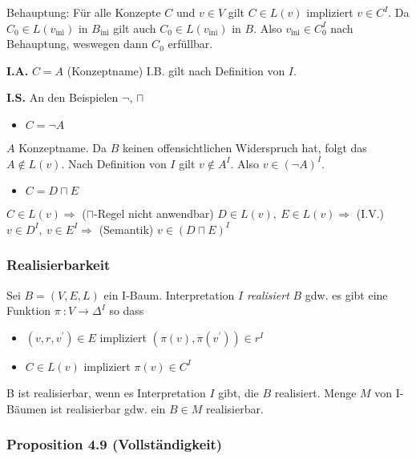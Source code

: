 Behauptung: Für alle Konzepte $C$ und $v \in V$ gilt
$C \in L\left( v \right)$ impliziert $v \in C^{I}$. Da
$C_{0} \in L\left( v_{\text{ini}} \right)$ in $B_{\text{ini}}$ gilt
auch $C_{0} \in L\left( v_{\text{ini}} \right)$ in $B$. Also
$v_{\text{ini}} \in C_{0}^{I}$ nach Behauptung, weswegen dann
$C_{0}$ erfüllbar.

\textbf{I.A.} $C = A$ (Konzeptname) I.B. gilt nach Definition von
$I$.

\textbf{I.S.} An den Beispielen $\neg$, $\sqcap$

\begin{itemize}
\item
  $C = \neg A$
\end{itemize}

$A$ Konzeptname. Da $B$ keinen offensichtlichen Widerspruch hat,
folgt das $A \notin L(v)$. Nach Definition von $I$ gilt
$v \notin A^{I}$. Also $v \in \left( \neg A \right)^{I}$.

\begin{itemize}
\item
  $C = D \sqcap E$
\end{itemize}

$C \in L\left( v \right) \Rightarrow$ ($\sqcap$-Regel nicht
anwendbar)
$D \in L\left( v \right),\ E \in L\left( v \right) \Rightarrow$ (I.V.)
$v \in D^{I},\ v \in E^{I} \Rightarrow$ (Semantik)
$v \in \left( D \sqcap E \right)^{I}$

\hypertarget{realisierbarkeit}{\subsubsection{Realisierbarkeit}\label{realisierbarkeit}}

Sei $B = \left( V,E,L \right)$ ein I-Baum. Interpretation $I$
\emph{realisiert} $B$ gdw. es gibt eine Funktion
$\pi\ :V \rightarrow \Delta^{I}$ so dass

\begin{itemize}
\item
  $\left( v,r,v^{'} \right) \in E$ impliziert
  $\left( \pi\left( v \right),\pi\left( v^{'} \right) \right) \in r^{I}$
\item
  $C \in L\left( v \right)$ impliziert
  $\pi\left( v \right) \in C^{I}$
\end{itemize}

B ist realisierbar, wenn es Interpretation $I$ gibt, die $B$
realisiert. Menge $M$ von I-Bäumen ist realisierbar gdw. ein
$B \in M$ realisierbar.

\subsubsection{Proposition 4.9
(Vollständigkeit)}\label{proposition-4.9-vollstuxe4ndigkeit}

